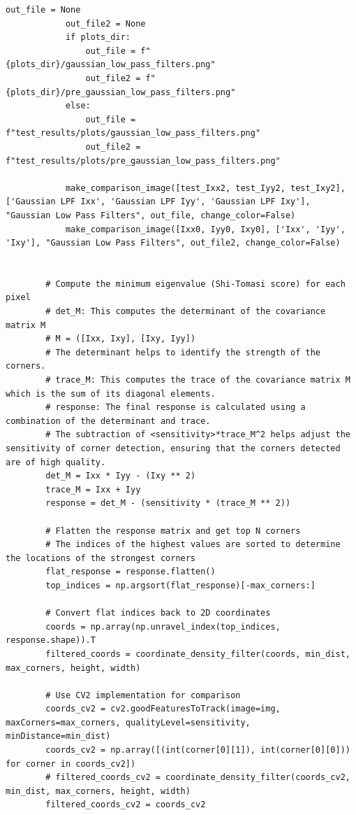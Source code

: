 \documentclass[11pt, conference, letterpaper]{IEEEtran}
\begin{document}
\begin{lstlisting}[style=python, caption={\texttt{shi\_tomasi\_corners.py}}, label={lst:stc}]
            out_file = None
            out_file2 = None
            if plots_dir:
                out_file = f"{plots_dir}/gaussian_low_pass_filters.png"
                out_file2 = f"{plots_dir}/pre_gaussian_low_pass_filters.png"
            else:
                out_file = f"test_results/plots/gaussian_low_pass_filters.png"
                out_file2 = f"test_results/plots/pre_gaussian_low_pass_filters.png"
                
            make_comparison_image([test_Ixx2, test_Iyy2, test_Ixy2], ['Gaussian LPF Ixx', 'Gaussian LPF Iyy', 'Gaussian LPF Ixy'], "Gaussian Low Pass Filters", out_file, change_color=False)
            make_comparison_image([Ixx0, Iyy0, Ixy0], ['Ixx', 'Iyy', 'Ixy'], "Gaussian Low Pass Filters", out_file2, change_color=False)
    
            
        # Compute the minimum eigenvalue (Shi-Tomasi score) for each pixel
        # det_M: This computes the determinant of the covariance matrix M
        # M = ([Ixx, Ixy], [Ixy, Iyy])
        # The determinant helps to identify the strength of the corners.
        # trace_M: This computes the trace of the covariance matrix M which is the sum of its diagonal elements.
        # response: The final response is calculated using a combination of the determinant and trace.
        # The subtraction of <sensitivity>*trace_M^2 helps adjust the sensitivity of corner detection, ensuring that the corners detected are of high quality.
        det_M = Ixx * Iyy - (Ixy ** 2)
        trace_M = Ixx + Iyy
        response = det_M - (sensitivity * (trace_M ** 2))
    
        # Flatten the response matrix and get top N corners
        # The indices of the highest values are sorted to determine the locations of the strongest corners
        flat_response = response.flatten()
        top_indices = np.argsort(flat_response)[-max_corners:]
    
        # Convert flat indices back to 2D coordinates
        coords = np.array(np.unravel_index(top_indices, response.shape)).T
        filtered_coords = coordinate_density_filter(coords, min_dist, max_corners, height, width)
    
        # Use CV2 implementation for comparison  
        coords_cv2 = cv2.goodFeaturesToTrack(image=img, maxCorners=max_corners, qualityLevel=sensitivity, minDistance=min_dist)
        coords_cv2 = np.array([(int(corner[0][1]), int(corner[0][0])) for corner in coords_cv2])
        # filtered_coords_cv2 = coordinate_density_filter(coords_cv2, min_dist, max_corners, height, width)
        filtered_coords_cv2 = coords_cv2
        

\end{lstlisting}
\end{document}

